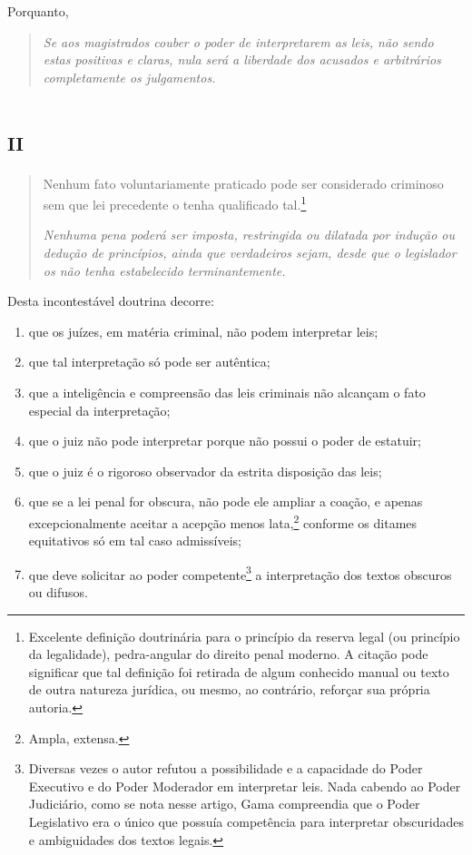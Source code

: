 Porquanto,

\begin{quote}
\emph{Se aos magistrados couber o poder de interpretarem as leis, não
sendo estas positivas e claras, nula será a liberdade dos acusados e
arbitrários completamente os julgamentos.}
\end{quote}

\section{\textsc{ii}}

\begin{quote}
Nenhum fato voluntariamente praticado pode ser considerado criminoso
sem que lei precedente o tenha qualificado tal.\footnote{Excelente
  definição doutrinária para o princípio da reserva legal (ou princípio
  da legalidade), pedra-angular do direito penal moderno. A citação
  pode significar que tal definição foi retirada de algum
  conhecido manual ou texto de outra natureza jurídica, ou mesmo, ao
  contrário, reforçar sua própria autoria.}

\emph{Nenhuma pena poderá ser imposta, restringida ou dilatada por
indução ou dedução de princípios, ainda que verdadeiros sejam, desde que
o legislador os não tenha estabelecido terminantemente.}
\end{quote}

Desta incontestável doutrina decorre:

\begin{enumerate}[label=\arabic*º:]
\item que os juízes, em matéria criminal, não podem interpretar leis;

\item que tal interpretação só pode ser autêntica;

\item que a inteligência e compreensão das leis criminais não alcançam o
fato especial da interpretação;

\item que o juiz não pode interpretar porque não possui o poder de
estatuir;

\item que o juiz é o rigoroso observador da estrita disposição das leis;

\item que se a lei penal for obscura, não pode ele ampliar a coação, e
apenas excepcionalmente aceitar a acepção menos lata,\footnote{Ampla,
  extensa.} conforme os ditames equitativos só em tal caso admissíveis;

\item que deve solicitar ao poder competente\footnote{Diversas vezes o
  autor refutou a possibilidade e a capacidade do Poder Executivo e do
  Poder Moderador em interpretar leis. Nada cabendo ao Poder Judiciário,
  como se nota nesse artigo, Gama compreendia que o Poder Legislativo
  era o único que possuía competência para interpretar obscuridades e
  ambiguidades dos textos legais.} a interpretação dos textos obscuros
ou difusos.
\end{enumerate}

